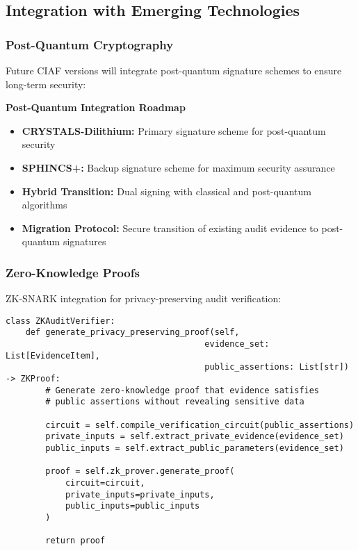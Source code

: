 \documentclass[12pt,a4paper]{article}
\begin{document}
\subsection{Integration with Emerging Technologies}

\subsubsection{Post-Quantum Cryptography}

Future CIAF versions will integrate post-quantum signature schemes to ensure long-term security:

\begin{technicalbox}
\textbf{Post-Quantum Integration Roadmap}
\begin{itemize}
\item \textbf{CRYSTALS-Dilithium:} Primary signature scheme for post-quantum security
\item \textbf{SPHINCS+:} Backup signature scheme for maximum security assurance
\item \textbf{Hybrid Transition:} Dual signing with classical and post-quantum algorithms
\item \textbf{Migration Protocol:} Secure transition of existing audit evidence to post-quantum signatures
\end{itemize}
\end{technicalbox}

\subsubsection{Zero-Knowledge Proofs}

ZK-SNARK integration for privacy-preserving audit verification:

\begin{lstlisting}[caption=Zero-Knowledge Proof Integration]
class ZKAuditVerifier:
    def generate_privacy_preserving_proof(self, 
                                        evidence_set: List[EvidenceItem],
                                        public_assertions: List[str]) -> ZKProof:
        # Generate zero-knowledge proof that evidence satisfies 
        # public assertions without revealing sensitive data
        
        circuit = self.compile_verification_circuit(public_assertions)
        private_inputs = self.extract_private_evidence(evidence_set)
        public_inputs = self.extract_public_parameters(evidence_set)
        
        proof = self.zk_prover.generate_proof(
            circuit=circuit,
            private_inputs=private_inputs,
            public_inputs=public_inputs
        )
        
        return proof
\end{lstlisting}
\end{document}
